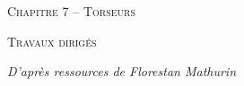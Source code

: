 \documentclass[10pt]{article}
\begin{document}

\begin{center}
\large{\textsc{Chapitre 7 -- Torseurs}}
\end{center}

\begin{center}
\textsc{Travaux dirigés}
\end{center}

\normalsize

\begin{flushright}
\textit{D'après ressources de Florestan Mathurin}
\end{flushright}

 \renewcommand{\baselinestretch}{1.2}
\end{document}
